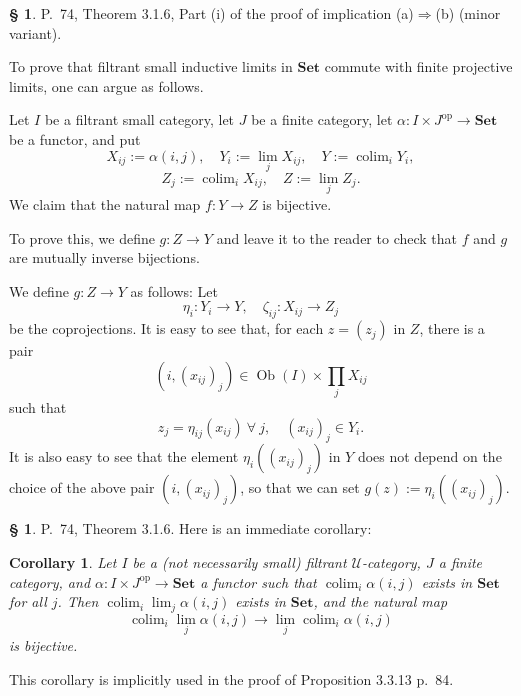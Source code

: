 \documentclass[12pt]{article}
\newtheorem{cor}[thm]{Corollary}
\theoremstyle{remark}
\theoremstyle{definition}
\newtheorem{s}[thm]{\S}
\newcommand{\U}{\mathcal U}
\newcommand{\Set}{\mathbf{Set}}
\newcommand{\then}{\Rightarrow}
\DeclareMathOperator*{\colim}{colim}
\DeclareMathOperator{\Ob}{Ob}
\DeclareMathOperator{\op}{op}
\begin{document}
%

\begin{s}%

P.~74, Theorem 3.1.6, Part (i) of the proof of implication (a)$\then$(b) (minor variant). 

To prove that filtrant small inductive limits in $\Set$ commute with finite projective limits, one can argue as follows. 

Let $I$ be a filtrant small category, let $J$ be a finite category, let $\alpha:I\times J^{\op}\to\Set$ be a functor, and put 
$$
X_{ij}:=\alpha(i,j),\quad Y_i:=\lim_jX_{ij},\quad Y:=\colim_iY_i,
$$
$$
Z_j:=\colim_iX_{ij},\quad Z:=\lim_jZ_j.
$$ 
We claim that the natural map $f:Y\to Z$ is bijective. 

To prove this, we define $g:Z\to Y$ and leave it to the reader to check that $f$ and $g$ are mutually inverse bijections. 

We define $g:Z\to Y$ as follows: Let 
$$
\eta_i:Y_i\to Y,\quad\zeta_{ij}:X_{ij}\to Z_j
$$ 
be the coprojections. It is easy to see that, for each $z=(z_j)$ in $Z$, there is a pair 
$$
(i,(x_{ij})_j)\in\Ob(I)\times\prod_jX_{ij}
$$ 
such that 
$$
z_j=\eta_{ij}(x_{ij})\ \forall\ j,\quad(x_{ij})_j\in Y_i. 
$$ 
It is also easy to see  that the element $\eta_i((x_{ij})_j)$ in $Y$ does not depend on the choice of the above pair $(i,(x_{ij})_j)$, so that we can set $g(z):=\eta_i((x_{ij})_j)$. 
\end{s}

%

\begin{s} 
P.~74, Theorem 3.1.6. Here is an immediate corollary: 
%
\begin{cor}\label{316}
Let $I$ be a (not necessarily small) filtrant $\U$-category, $J$ a finite category, and $\alpha:I\times J^{\op}\to\Set$ a functor such that $\colim_i\alpha(i,j)$ exists in $\Set$ for all $j$. Then $\colim_i\lim_j\alpha(i,j)$ exists in $\Set$, and the natural map 
$$
\colim_i\lim_j\alpha(i,j)\to
\lim_j\colim_i\alpha(i,j)
$$ 
is bijective. 
\end{cor}
%
This corollary is implicitly used in the proof of Proposition 3.3.13 p.~84.
\end{s}

%
\end{document}
